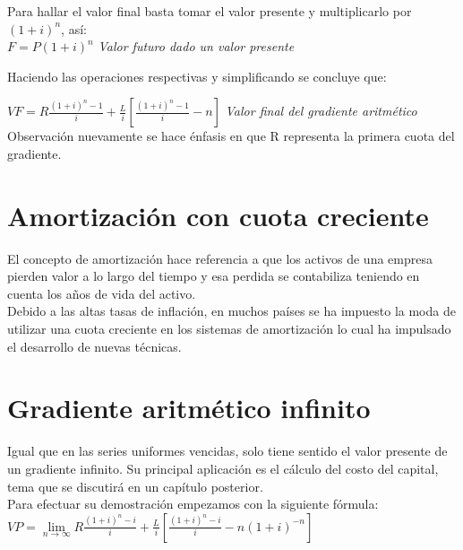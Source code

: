 	Para hallar el valor final basta tomar el valor presente y multiplicarlo por $(1+i)^n$, así:\\
$F= P(1+i)^n$ \hspace{120pt} \textit{Valor futuro dado un valor presente}
	
	\vspace{2mm}
	Haciendo las operaciones respectivas y simplificando se concluye que:
	
$VF = R\frac{(1+i)^n-1}{i} + \frac{L}{i}[\frac{(1+i)^n-1}{i}-n]$ \hspace{35pt} \textit{Valor final del gradiente aritmético}\\
	
	\textrm{Observación} nuevamente se hace énfasis en que R representa la primera cuota del gradiente.\\
	

		      
		      \section{Amortización con cuota creciente}
		      
		      El concepto de amortización hace referencia a que los activos de una empresa pierden valor a lo largo del tiempo y esa perdida se contabiliza teniendo en cuenta los años de vida del activo. \\
		      
		      Debido a las altas tasas de inflación, en muchos países se ha impuesto la moda de utilizar una cuota creciente en los sistemas de amortización lo cual ha impulsado el desarrollo de nuevas técnicas.\\
		      


	\section{Gradiente aritmético infinito}
	Igual que en las series uniformes vencidas, solo tiene sentido el valor presente de un gradiente 	infinito. Su principal aplicación es el cálculo del costo del capital, tema que se discutirá en un capítulo posterior.\\
	Para efectuar su demostración empezamos con la siguiente fórmula: \\
	
$VP = \lim\limits_{n \to \infty} R\frac{(1+i)^n-i}{i}+\frac{L}{i}[\frac{(1+i)^n-i}{i}-n(1+i)^{-n}] $\\

